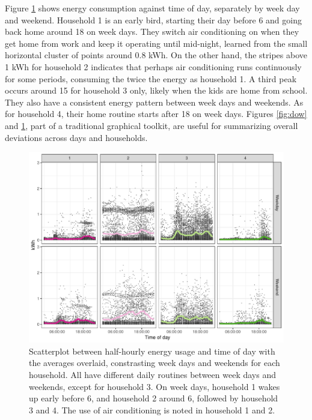 \documentclass[12pt]{article}
\begin{document}
Figure \ref{fig:hod} shows energy consumption against time of day, separately by week day and weekend. Household 1 is an early bird, starting their day before 6 and going back home around 18 on week days. They switch air conditioning on when they get home from work and keep it operating until mid-night, learned from the small horizontal cluster of points around 0.8 kWh. On the other hand, the stripes above 1 kWh for household 2 indicates that perhaps air conditioning runs continuously for some periods, consuming the twice the energy as household 1. A third peak occurs around 15 for household 3 only, likely when the kids are home from school. They also have a consistent energy pattern between week days and weekends. As for household 4, their home routine starts after 18 on week days. Figures \ref{fig:dow} and \ref{fig:hod}, part of a traditional graphical toolkit, are useful for summarizing overall deviations across days and households.

\begin{figure}

{\centering \includegraphics[width=\textwidth]{figure/hod-1} 

}

\caption{Scatterplot between half-hourly energy usage and time of day with the averages overlaid, constrasting week days and weekends for each household. All have different daily routines between week days and weekends, except for household 3. On week days, household 1 wakes up early before 6, and household 2 around 6, followed by household 3 and 4. The use of air conditioning is noted in household 1 and 2.}\label{fig:hod}
\end{figure}
\end{document}
